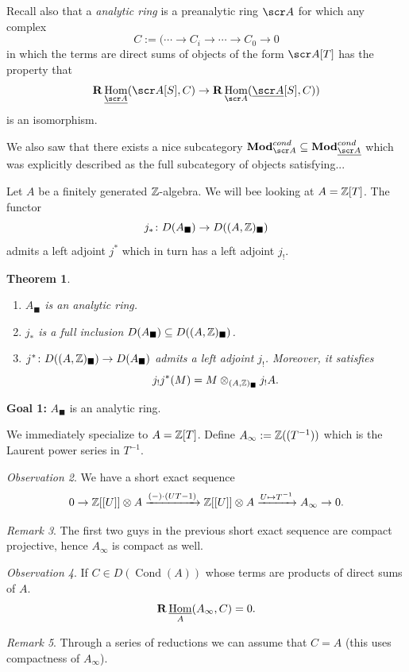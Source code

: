 \documentclass[A4paper, british, reqno]{amsart}
\theoremstyle{darkgreentheorem}
\newtheorem{thm}{Theorem}[section]
\theoremstyle{darkbluedefinition}
\theoremstyle{darkredexample}
\theoremstyle{remark}
\newtheorem{rem}[thm]{Remark}
\newtheorem{obs}[thm]{Observation}
\DeclareMathOperator{\Hom}{Hom}
\DeclareMathOperator{\Cond}{Cond}
\DeclareMathOperator{\ihom}{\underline{Hom}}
\newcommand{\1}{\mathbbm{1}}
\renewcommand{\u}[1]{\underline{#1}}
\newcommand{\ot}{\otimes}
\newcommand{\sub}{\subseteq}
\newcommand{\usolid}{_{\blacksquare}}
\begin{document}
Recall also that a \textit{analytic ring} is a preanalytic ring $\sA$ for which any complex
\[ C:= (\cdots \to C_{i}\to \cdots \to C_{0}\to 0 \]
in which the terms are direct sums of objects of the form $\sA[T]$ has the property that
\[ \bfR\Hom_{\u{\sA}}(\sA[S],C)\to \bfR\Hom_{\sA}(\u{\sA}[S],C)) \]
is an isomorphism.

We also saw that there exists a nice subcategory $\Mod_{\sA}^{cond}\sub \Mod_{\u{\sA}}^{cond}$ which was explicitly described as the full subcategory of objects satisfying...

Let $A$ be a finitely generated $\mathbb{Z}$-algebra.
We will bee looking at $A=\mathbb{Z}[T]$.
The functor
\[ j_{*}\colon D(A\usolid)\to D((A,\Z)\usolid) \]
admits a left adjoint $j^{*}$ which in turn has a left adjoint $j_{!}$.

\begin{thm}
    \begin{enumerate}
	\item $A\usolid$ is an analytic ring.
	\item $j_{*}$ is a full inclusion $D(A\usolid)\sub D((A,\Z)\usolid)$.
	\item $j^{*}\colon D((A,\Z)\usolid)\to D(A\usolid)$ admits a left adjoint $j_{!}$.
	    Moreover, it satisfies
	    \[ j_{!}j^{*}(M)=M\ot_{(A,\Z)\usolid}j_{!}A. \]
    \end{enumerate}
\end{thm}

\textbf{Goal 1:} $A\usolid$ is an analytic ring.

We immediately specialize to $A=\mathbb{Z}[T]$.
Define $A_{\infty}:=\mathbb{Z}((T^{-1}))$ which is the Laurent power series in $T^{-1}$.

\begin{obs}
    We have a short exact sequence
    \[ 0 \to \Z[[U]]\ot A\xrightarrow{(-)\cdot (UT-1)} \Z[[U]]\ot A\xrightarrow{U\mapsto T^{-1}}A_{\infty}\to 0. \]
\end{obs}

\begin{rem}
    The first two guys in the previous short exact sequence are compact projective, hence $A_{\infty}$ is compact as well.
\end{rem}

\begin{obs}
    If $C\in D(\Cond(A))$ whose terms are products of direct sums of $A$.
    \[ \bfR\ihom_{A}(A_{\infty},C)=0 .\]
\end{obs}

\begin{rem}
    Through a series of reductions we can assume that $C=A$ (this uses compactness of $A_{\infty}$).
\end{rem}
\end{document}

